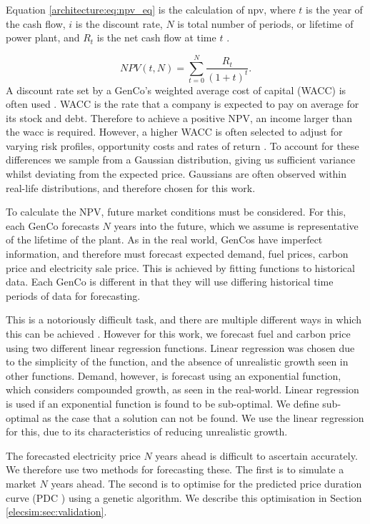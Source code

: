 Equation \ref{architecture:eq:npv_eq} is the calculation of \acrshort{npv}, where $t$ is the year of the cash flow, $i$ is the discount rate, $N$ is total number of periods, or lifetime of power plant, and $R_t$ is the net cash flow at time $t$ \cite{nagalingam2020cim}.

\begin{equation} \label{architecture:eq:npv_eq}
NPV(t, N) = \sum_{t=0}^{N}\frac{R_t}{(1+t)^t}.
\end{equation}
A discount rate set by a GenCo's weighted average cost of capital (WACC) is often used \cite{KincheloeStephenC1990TWAC}. WACC is the rate that a company is expected to pay on average for its stock and debt. Therefore to achieve a positive NPV, an income larger than the \acrshort{wacc} is required. However, a higher WACC is often selected to adjust for varying risk profiles, opportunity costs and rates of return \cite{KincheloeStephenC1990TWAC}. To account for these differences we sample from a Gaussian distribution, giving us sufficient variance whilst deviating from the expected price. Gaussians are often observed within real-life distributions, and therefore chosen for this work.

To calculate the NPV, future market conditions must be considered. For this, each GenCo forecasts $N$ years into the future, which we assume is representative of the lifetime of the plant. As in the real world, GenCos have imperfect information, and therefore must forecast expected demand, fuel prices, carbon price and electricity sale price. This is achieved by fitting functions to historical data. Each GenCo is different in that they will use differing historical time periods of data for forecasting.

This is a notoriously difficult task, and there are multiple different ways in which this can be achieved \cite{Tao2021}. However for this work, we forecast fuel and carbon price using two different linear regression functions. Linear regression was chosen due to the simplicity of the function, and the absence of unrealistic growth seen in other functions. Demand, however, is forecast using an exponential function, which considers compounded growth, as seen in the real-world. Linear regression is used if an exponential function is found to be sub-optimal. We define sub-optimal as the case that a solution can not be found. We use the linear regression for this, due to its characteristics of reducing unrealistic growth.

The forecasted electricity price $N$ years ahead is difficult to ascertain accurately. We therefore use two methods for forecasting these. The first is to simulate a market $N$ years ahead. The second is to optimise for the predicted price duration curve (PDC ) using a genetic algorithm. We describe this optimisation in Section \ref{elecsim:sec:validation}.

